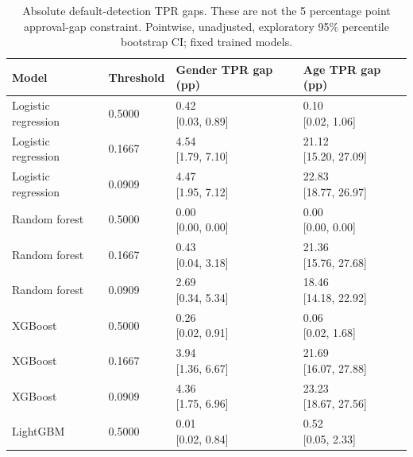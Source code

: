 \begingroup
\scriptsize
\setlength{\tabcolsep}{3pt}
\begin{longtable}{llll}
\caption{Absolute default-detection TPR gaps. These are not the 5 percentage point approval-gap constraint. Pointwise, unadjusted, exploratory 95\% percentile bootstrap CI; fixed trained models.}\label{tab:tpr-gaps-level4}\\
\toprule
Model & Threshold & Gender TPR gap (pp) & Age TPR gap (pp) \\
\midrule
Logistic regression & 0.5000 & \shortstack{{0.42} \\ {[0.03, 0.89]}} & \shortstack{{0.10} \\ {[0.02, 1.06]}} \\
Logistic regression & 0.1667 & \shortstack{{4.54} \\ {[1.79, 7.10]}} & \shortstack{{21.12} \\ {[15.20, 27.09]}} \\
Logistic regression & 0.0909 & \shortstack{{4.47} \\ {[1.95, 7.12]}} & \shortstack{{22.83} \\ {[18.77, 26.97]}} \\
Random forest & 0.5000 & \shortstack{{0.00} \\ {[0.00, 0.00]}} & \shortstack{{0.00} \\ {[0.00, 0.00]}} \\
Random forest & 0.1667 & \shortstack{{0.43} \\ {[0.04, 3.18]}} & \shortstack{{21.36} \\ {[15.76, 27.68]}} \\
Random forest & 0.0909 & \shortstack{{2.69} \\ {[0.34, 5.34]}} & \shortstack{{18.46} \\ {[14.18, 22.92]}} \\
XGBoost & 0.5000 & \shortstack{{0.26} \\ {[0.02, 0.91]}} & \shortstack{{0.06} \\ {[0.02, 1.68]}} \\
XGBoost & 0.1667 & \shortstack{{3.94} \\ {[1.36, 6.67]}} & \shortstack{{21.69} \\ {[16.07, 27.88]}} \\
XGBoost & 0.0909 & \shortstack{{4.36} \\ {[1.75, 6.96]}} & \shortstack{{23.23} \\ {[18.67, 27.56]}} \\
LightGBM & 0.5000 & \shortstack{{0.01} \\ {[0.02, 0.84]}} & \shortstack{{0.52} \\ {[0.05, 2.33]}} \\

\end{longtable}
